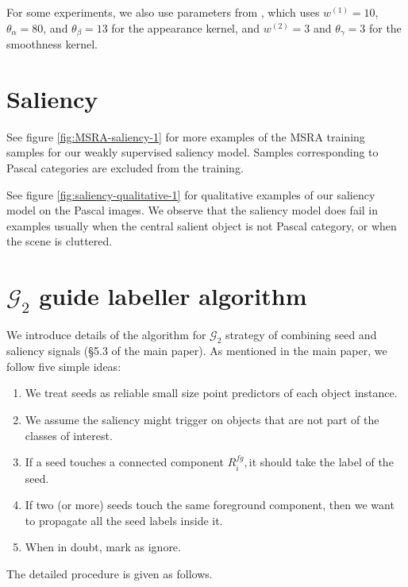 \documentclass[british,10pt,twocolumn,letterpaper]{article}
\begin{document}
For some experiments, we also use parameters from \cite{kolesnikov2016seed},
which uses $w^{(1)}=10$, $\theta_{\alpha}=80$, and $\theta_{\beta}=13$
for the appearance kernel, and $w^{(2)}=3$ and $\theta_{\gamma}=3$
for the smoothness kernel.

\section{\label{sec:supp-saliency}Saliency}

See figure \ref{fig:MSRA-saliency-1} for more examples of the MSRA
training samples for our weakly supervised saliency model. Samples
corresponding to Pascal categories are excluded from the training.

See figure \ref{fig:saliency-qualitative-1} for qualitative examples
of our saliency model on the Pascal images. We observe that the saliency
model does fail in examples usually when the central salient object
is not Pascal category, or when the scene is cluttered.

\section{\label{sec:supp-alg}$\mathcal{G}_{2}$ guide labeller algorithm}

We introduce details of the algorithm for $\mathcal{G}_{2}$ strategy
of combining seed and saliency signals (\S5.3 of the main paper).
As mentioned in the main paper, we follow five simple ideas:
\begin{enumerate}
\item We treat seeds as reliable small size point predictors of each object
instance.
\item We assume the saliency might trigger on objects that are not part
of the classes of interest.
\item If a seed touches a connected component $R_{i}^{fg},$it should take
the label of the seed.
\item If two (or more) seeds touch the same foreground component, then we
want to propagate all the seed labels inside it.
\item When in doubt, mark as ignore.
\end{enumerate}
The detailed procedure is given as follows.
\end{document}
